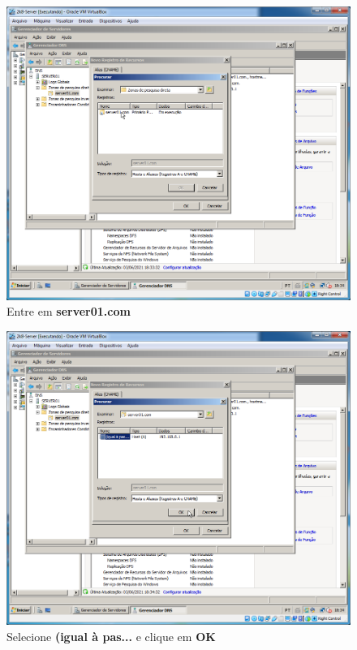 \documentclass[10pt]{article}
\begin{document}
\begin{figure}[H]
    \centering
    \caption{Entre em \textbf{server01.com}}
    \label{fig:DNS037}
    \includegraphics[width=\linewidth]{images/windows_server/dns/037.png}
\end{figure}
\begin{figure}[H]
    \centering
    \caption{Selecione \textbf{(igual à pas...} e clique em \textbf{OK}}
    \label{fig:DNS038}
    \includegraphics[width=\linewidth]{images/windows_server/dns/038.png}
\end{figure}
\end{document}
